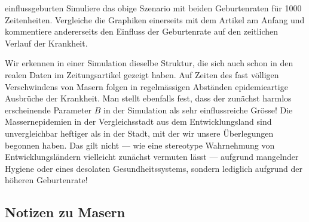 \documentclass[%
<<<<<<< Updated upstream
11pt,%
twoside,%
titlepage,%
german,%
headsepline%
]{scrartcl}
\begin{document}
\begin{uebenv}{einflussgeburten}
Simuliere das obige Szenario mit beiden Geburtenraten für 1000 Zeitenheiten. Vergleiche die Graphiken einerseits mit dem Artikel am Anfang und kommentiere andererseits den Einfluss der Geburtenrate auf den zeitlichen Verlauf der Krankheit.
\end{uebenv}

Wir erkennen in einer Simulation dieselbe Struktur, die sich auch schon in den realen Daten im Zeitungsartikel gezeigt haben. Auf Zeiten des fast völligen Verschwindens von Masern folgen in regelmässigen Abständen epidemieartige Ausbrüche der Krankheit. Man stellt ebenfalls fest, dass der zunächst harmlos erscheinende Parameter $B$ in der Simulation als sehr einflussreiche Grösse! Die Massernepidemien in der Vergleichsstadt aus dem Entwicklungsland sind unvergleichbar heftiger als in der Stadt, mit der wir unsere Überlegungen begonnen haben. Das gilt nicht --- wie eine stereotype Wahrnehmung von Entwicklungsländern vielleicht zunächst vermuten lässt --- aufgrund mangelnder Hygiene oder eines desolaten Gesundheitssystems, sondern lediglich aufgrund der höheren Geburtenrate!

\clearpage

\subsection{Notizen zu Masern}
\end{document}
